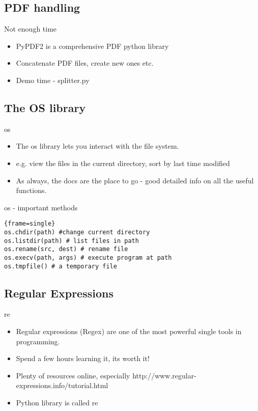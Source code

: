 \documentclass{beamer}
\begin{document}
\subsection{PDF handling}
\begin{frame}[fragile]{Not enough time}
	\begin{itemize}
	\item {PyPDF2 is a comprehensive PDF python library
	}
	\item {Concatenate PDF files, create new ones etc.}
	\pause
	\item Demo time - splitter.py
	\end{itemize}
\end{frame}
\subsection{The OS library}
\begin{frame}[fragile]{os}
	\begin{itemize}
	\item {The os library lets you interact with the file system.  }
	\item e.g. view the files in the current directory, sort by last time modified
	\pause
	\item As always, the docs are the place to go - good detailed info on all the useful functions.
	\end{itemize}
\end{frame}

\begin{frame}[fragile]{os - important methods}
\begin{block}{}
\begin{lstlisting}{frame=single}
os.chdir(path) #change current directory
os.listdir(path) # list files in path
os.rename(src, dest) # rename file
os.execv(path, args) # execute program at path
os.tmpfile() # a temporary file
\end{lstlisting}
\end{block}
\end{frame}

\subsection{Regular Expressions}
\begin{frame}[fragile]{re}
	\begin{itemize}
	\item {Regular expressions (Regex) are one of the most powerful single tools in programming.
	}
	\pause
	\item Spend a few hours learning it, its worth it!
	\item Plenty of resources online, especially http://www.regular-expressions.info/tutorial.html
	\item Python library is called re
	\end{itemize}
\end{frame}
\end{document}
